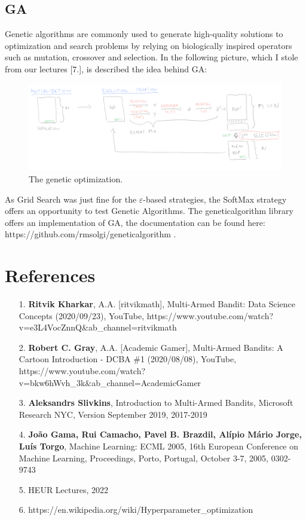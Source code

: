 \documentclass[11pt,american,czech]{article}
\begin{document}
\subsection*{GA}
Genetic algorithms are commonly used to generate high-quality solutions to optimization and search problems by relying on biologically inspired operators such as mutation, crossover and selection. In the following picture, which I stole from our lectures [7.], is described the idea behind GA:

\begin{figure}[h]
\includegraphics[scale=0.45]{go_overview.png}
\caption{The genetic optimization.}
\end{figure}

As Grid Search was just fine for the $\varepsilon$-based strategies, the SoftMax strategy offers an opportunity to test Genetic Algorithms. The geneticalgorithm library offers an implementation of GA, the documentation can be found here: https://github.com/rmsolgi/geneticalgorithm .






	\clearpage
	\section*{References}
	\begin{enumerate}
		\item[1.] \textbf{Ritvik Kharkar}, A.A. [ritvikmath], Multi-Armed Bandit: Data Science Concepts (2020/09/23), YouTube, https://www.youtube.com/watch?v=e3L4VocZnnQ\&ab\_channel=ritvikmath
		\item[2.] \textbf{Robert C. Gray}, A.A. [Academic Gamer], Multi-Armed Bandits: A Cartoon Introduction - DCBA \#1 (2020/08/08), YouTube, \\https://www.youtube.com/watch?v=bkw6hWvh\_3k\&ab\_channel=AcademicGamer
		\item[3.] \textbf{Aleksandrs Slivkins}, Introduction to Multi-Armed Bandits, Microsoft Research NYC, Version September 2019, 2017-2019
		\item[4.] \textbf{João Gama, Rui Camacho, Pavel B. Brazdil, Alípio Mário Jorge, Luís Torgo}, Machine Learning: ECML 2005, 16th European Conference on Machine Learning, Proceedings, Porto, Portugal, October 3-7, 2005, 0302-9743
		\item[5.] HEUR Lectures, 2022
		\item[6.] https://en.wikipedia.org/wiki/Hyperparameter\_optimization
	\end{enumerate}
	
\end{document}
